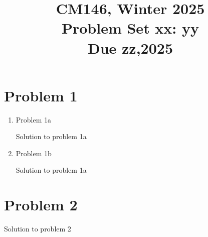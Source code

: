 \documentclass[11pt]{article}
\newcommand{\cnum}{CM146}
\newcommand{\ced}{Winter 2025}
\newcommand{\ctitle}[3]{\title{\vspace{-0.5in}\cnum, \ced\\Problem Set #1: #2\\Due #3}}
\newcommand{\solution}[1]{{{\color{blue}{\bf Solution:} {#1}}}}
\begin{document}
\ctitle{xx}{yy}{zz,2025}
\author{}
\date{}
\maketitle
\vspace{-0.75in}

\section{Problem 1}
\begin{enumerate}
\item Problem 1a

\solution{Solution to problem 1a}

\vspace{10cm}
\item Problem 1b

\solution{Solution to problem 1a}
\end{enumerate}

\newpage
\section{Problem 2}

\solution{Solution to problem 2}
\newpage
\end{document}
